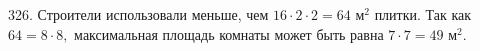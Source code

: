 326. Строители использовали меньше, чем $16\cdot2\cdot2=64\text{ м}^2$ плитки. Так как $64=8\cdot8,$ максимальная площадь комнаты может быть равна $7\cdot7=49\text{ м}^2.$\\
